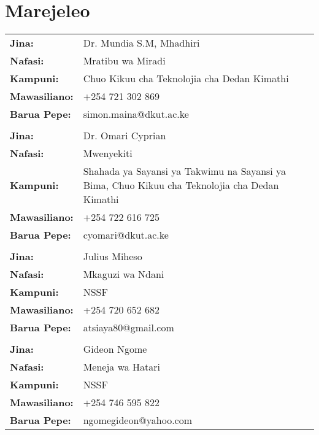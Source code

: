 \documentclass[11pt,a4paper,sans,swahili]{moderncv}
\begin{document}
	\section{Marejeleo}
	\begin{center}
		\begin{tabular}{p{6cm}p{8cm}}
			\textbf{Jina:} & Dr. Mundia S.M, Mhadhiri\\
			\textbf{Nafasi:} & Mratibu wa Miradi\\
			\textbf{Kampuni:} & Chuo Kikuu cha Teknolojia cha Dedan Kimathi \\
			\textbf{Mawasiliano:} & +254 721 302 869\\
			\textbf{Barua Pepe:} & simon.maina@dkut.ac.ke \\
			\\
			\textbf{Jina:} & Dr. Omari Cyprian \\
			\textbf{Nafasi:} & Mwenyekiti \\
			\textbf{Kampuni:} & Shahada ya Sayansi ya Takwimu na Sayansi ya Bima, Chuo Kikuu cha Teknolojia cha Dedan Kimathi \\
			\textbf{Mawasiliano:} & +254 722 616 725 \\
			\textbf{Barua Pepe:} & cyomari@dkut.ac.ke \\
			\\
			\textbf{Jina:} & Julius Miheso \\
			\textbf{Nafasi:} & Mkaguzi wa Ndani \\
			\textbf{Kampuni:} & NSSF \\
			\textbf{Mawasiliano:} & +254 720 652 682 \\
			\textbf{Barua Pepe:} & atsiaya80@gmail.com \\
			\\
			\textbf{Jina:} & Gideon Ngome \\
			\textbf{Nafasi:} & Meneja wa Hatari \\
			\textbf{Kampuni:} & NSSF \\
			\textbf{Mawasiliano:} & +254 746 595 822 \\
			\textbf{Barua Pepe:} & ngomegideon@yahoo.com \\
		\end{tabular}
	\end{center}
	
\end{document}
